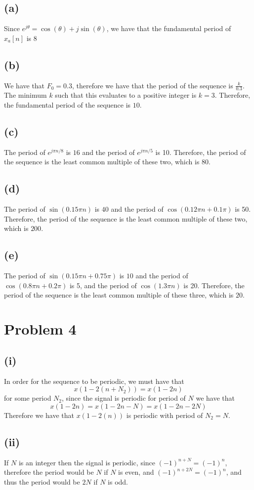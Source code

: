 \subsection*{(a)}
Since $e^{j\theta} = \cos(\theta) + j\sin(\theta)$, we have
that the fundamental period of $\hat{x}_a[n]$ is $\boxed{8}$
\subsection*{(b)}
We have that $F_0=0.3$, therefore we have that the period of the sequence
is $\frac{k}{0.3}$. The minimum $k$ such that this evaluates to a
positive integer is $k=3$. Therefore, the fundamental period of
the sequence is $\boxed{10}$.
\subsection*{(c)}
The period of $e^{j\pi n /8}$ is $16$ and the period of
 $e^{j\pi n /5}$ is 10. Therefore, the period of the sequence
 is the least common multiple of these two, which is $\boxed{80}$. 
\subsection*{(d)}
The period of $\sin(0.15\pi n)$ is $40$ and the period of
 $\cos(0.12\pi n+0.1\pi)$ is 50. Therefore, the period of the sequence
 is the least common multiple of these two, which is $\boxed{200}$. 
\subsection*{(e)}
The period of $\sin(0.15\pi n+0.75\pi)$ is $10$ and the period of
 $\cos(0.8\pi n+0.2\pi)$ is 5, and the period of $\cos(1.3\pi n)$ is 20. Therefore, the period of the sequence
 is the least common multiple of these three, which is $\boxed{20}$.
 \section*{Problem 4}
 \subsection*{(i)}
 In order for the sequence to be periodic, we must have that
 $$x(1-2(n+N_2)) = x(1-2n)$$
 for some period $N_2$, since the signal is periodic for period of 
 $N$ we have that
 $$x(1-2n)=x(1-2n-N)=x(1-2n-2N)$$
 Therefore we have that $x(1-2(n))$ is periodic with period of $N_2=N$.
\subsection*{(ii)}
If $N$ is an integer then the signal is $\boxed{\text{periodic}}$, since $(-1)^{n+N}=(-1)^{n}$, therefore
the period would be $\boxed{N}$
if $N$ is even, and $(-1)^{n+2N}=(-1)^{n}$, and thus the period would be $\boxed{2N}$ if $N$ is odd.
